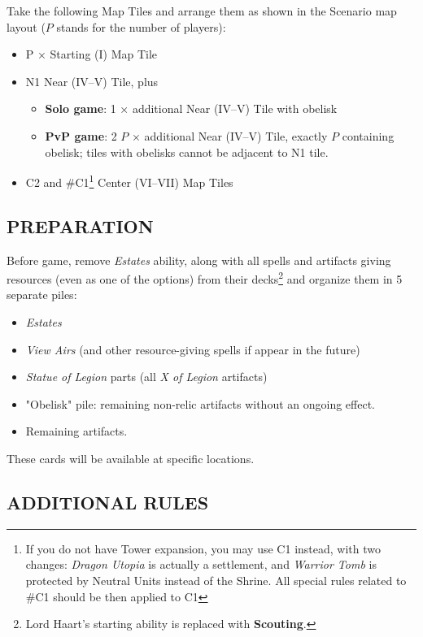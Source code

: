 \begin{multicols*}{2}
    Take the following Map Tiles and arrange them as shown in the Scenario map layout ($P$ stands for the number of players):
    \begin{itemize}
        \item P × Starting (I) Map Tile
        \item N1 Near (IV--V) Tile, plus \begin{itemize}
            \item \textbf{Solo game}: 1 × additional Near (IV--V) Tile with obelisk
            \item \textbf{PvP game}: 2 $P$ × additional Near (IV--V) Tile, exactly $P$ containing obelisk; tiles with obelisks cannot be adjacent to N1 tile.
        \end{itemize}
        \item C2 and \#C1\footnote{If you do not have Tower expansion, you may use C1 instead, with two changes: \textit{Dragon Utopia} is actually a settlement, and \textit{Warrior Tomb} is protected by Neutral Units instead of the Shrine. All special rules related to \#C1 should be then applied to C1} Center (VI--VII) Map Tiles
    \end{itemize}

    \subsection*{\MakeUppercase{Preparation}}

    Before game, remove \textit{Estates} ability, along with all spells and artifacts giving resources (even as one of the options) from their decks\footnote{Lord Haart's starting ability is replaced with \textbf{Scouting}.} and organize them in 5 separate piles:

    \begin{itemize}
        \item \textit{Estates}
        \item \textit{View Airs} (and other resource-giving spells if appear in the future)
        \item \textit{Statue of Legion} parts (all \textit{X of Legion} artifacts)
        \item "Obelisk" pile: remaining non-relic artifacts without an ongoing effect.
        \item Remaining artifacts.
    \end{itemize}

    These cards will be available at specific locations.

    \subsection*{\MakeUppercase{Additional Rules}}


\end{multicols*}

